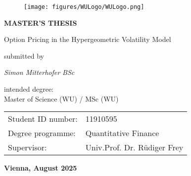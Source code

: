\documentclass[a4paper,11pt]{article}
\begin{document}

\thispagestyle{empty}
\begin{figure}[h!]
    \raggedleft
    \texttt{[image: figures/WULogo/WULogo.png]}
\end{figure}


\begin{center}
    \textbf{\huge MASTER’S THESIS} \\
    \vspace{1.5cm}

    \LARGE Option Pricing in the Hypergeometric Volatility Model \\
    \vspace{2.5cm}
    
    \normalsize submitted by \\
    \vspace{0.5cm}
    
    \textit{\Large Simon Mitterhofer BSc}
    \vspace{2cm}
    
    intended degree: \\
    \Large Master of Science (WU) / MSc (WU)
        \\
\vspace{1cm}
\normalsize

    \begin{tabular}{ll}
        Student ID number: & 11910595 \\
        Degree programme: & Quantitative Finance \\
        Supervisor: & Univ.Prof. Dr. Rüdiger Frey \\
    \end{tabular}
    \vspace{2cm}
    
    \textbf{Vienna, August 2025}
\end{center}

\newpage




\tableofcontents








\appendix



\end{document}
